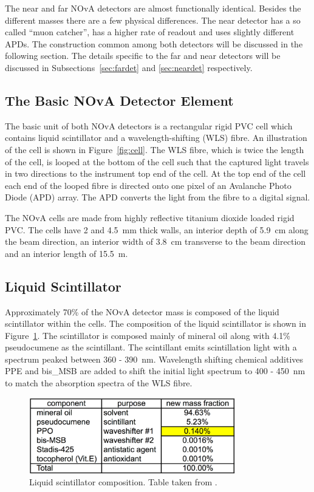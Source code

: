 The near and far NOvA detectors are almost functionally
identical. Besides
the different masses there are a few physical
differences. The near detector has a so called ``muon catcher'', has a
higher rate of readout and uses slightly different APDs. The
construction common among both detectors will be discussed in the
following section. The details specific to the far and near detectors
will be discussed in Subsections~\ref{sec:fardet} and
\ref{sec:neardet} respectively.

\subsection{The Basic NOvA Detector Element} \label{sec:cell}

The basic unit of both NOvA detectors is a rectangular rigid PVC cell
which contains liquid scintillator and a wavelength-shifting (WLS)
fibre. An illustration of the cell is shown in
Figure~\ref{fig:cell}. The WLS fibre, which is twice the length of the
cell, is looped at the bottom of the cell such that the captured light
travels in two directions to the instrument top end of the cell. At
the top end of the cell each end of the looped fibre is directed onto
one pixel of an Avalanche Photo Diode (APD) array. The APD converts
the light from the fibre to a digital signal.

The NOvA cells are made from highly reflective titanium dioxide loaded
rigid PVC. The cells have 2 and 4.5~mm thick walls, an interior depth
of 5.9~cm along the beam direction, an interior width of 3.8~cm
transverse to the beam direction and an interior length of 15.5~m.


\subsection{Liquid Scintillator}

Approximately 70\% of the NOvA detector mass is composed of the liquid
scintillator within the cells. The composition of the liquid
scintillator is shown in Figure~\ref{fig:scintComp}. The scintillator
is composed mainly of mineral oil along with 4.1\% pseudocumene as the
scintillant. The scintillant emits scintillation light with a spectrum
peaked between 360 - 390~nm. Wavelength shifting chemical
additives PPE and bis\_MSB are added to shift the initial light
spectrum to 400 - 450~nm to match the absorption spectra of the WLS
fibre. 

\begin{figure}
  \centering
  \includegraphics[width=0.8\textwidth]{../../img/det/gen/ScintCompTable.png}
  \caption{Liquid scintillator composition. Table taken from \cite{scintillatorComp}. }
  \label{fig:scintComp}
\end{figure}


